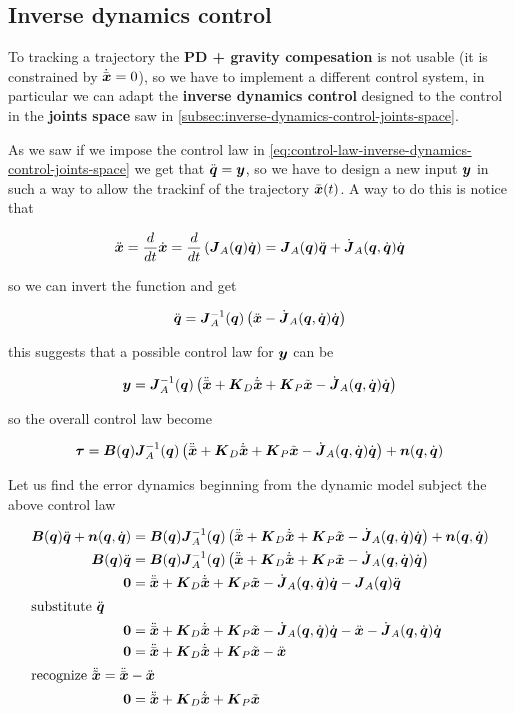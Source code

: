 \subsection{Inverse dynamics control}

To tracking a trajectory the \textbf{PD + gravity compesation} is not usable (it is constrained by $\dxd = 0$), so we have to implement a different control system, in particular we can adapt the \textbf{inverse dynamics control} designed to the control in the \textbf{joints space} saw in \autoref{subsec:inverse-dynamics-control-joints-space}.

As we saw if we impose the control law in \autoref{eq:control-law-inverse-dynamics-control-joints-space} we get that $\ddq = \y$, so we have to design a new input $\y$ in such a way to allow the trackinf of the trajectory $\xd(t)$.
A way to do this is notice that

\[
	\ddx = \frac{d}{dt} \dx = \frac{d}{dt} \left( \J_A(\q)\dq \right) = \J_A(\q)\ddq + \dJ_A(\q,\dq)\dq
\]

so we can invert the function and get

\[
	\ddq = \J_A^\inv(\q) \left(\ddx - \dJ_A(\q,\dq)\dq\right)
\]

this suggests that a possible control law for $\y$ can be

\[
	\y = \J_A^\inv(\q) \left( \ddxd + \K_D\dxe + \K_P \xe - \dJ_A(\q,\dq)\dq \right)
\]

so the overall control law become

\[
	\vect\tau = \B(\q) \J_A^\inv(\q) \left( \ddxd + \K_D\dxe + \K_P \xe - \dJ_A(\q,\dq)\dq \right) + \vect n(\q,\dq)
\]

Let us find the error dynamics beginning from the dynamic model subject the above control law

\begin{align*}
    \matr{B}(\q)\ddq + \vect n(\q,\dq) &= \B(\q) \J_A^\inv(\q) \left( \ddxd + \K_D\dxe + \K_P \xe - \dJ_A(\q,\dq)\dq \right) + \vect n(\q,\dq) \\
    \matr{B}(\q)\ddq &= \B(\q) \J_A^\inv(\q) \left( \ddxd + \K_D\dxe + \K_P \xe - \dJ_A(\q,\dq)\dq \right) \\
    \0 &= \ddxd + \K_D\dxe + \K_P \xe - \dJ_A(\q,\dq)\dq - \J_A(\q) \ddq \\
    \intertext{substitute $\ddq$}
    \0 &= \ddxd + \K_D\dxe + \K_P \xe - \dJ_A(\q,\dq)\dq - \ddx - \dJ_A(\q,\dq)\dq \\
    \0 &= \ddxd + \K_D\dxe + \K_P \xe - \ddx \\
    \intertext{recognize $\ddxe = \ddxd - \ddx$}
    \0 &= \ddxe + \K_D\dxe + \K_P \xe \\
\end{align*}

